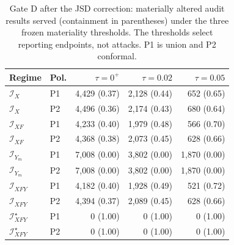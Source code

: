 \begin{table}[!tbp]
\caption{Gate D after the JSD correction: materially altered audit results served (containment in parentheses) under the three frozen materiality thresholds. The thresholds select reporting endpoints, not attacks. P1 is union and P2 conformal.}
\label{tab:s-policy-tau}
\centering\scriptsize\setlength{\tabcolsep}{2.5pt}
\begin{tabular}{@{}llrrr@{}}
\toprule
Regime & Pol. & $\tau=0^{+}$ & $\tau=0.02$ & $\tau=0.05$ \\
\midrule
$\mathcal I_X$ & P1 & 4,429 (0.37) & 2,128 (0.44) & 652 (0.65) \\
$\mathcal I_X$ & P2 & 4,496 (0.36) & 2,174 (0.43) & 680 (0.64) \\
$\mathcal I_{XF}$ & P1 & 4,233 (0.40) & 1,979 (0.48) & 566 (0.70) \\
$\mathcal I_{XF}$ & P2 & 4,368 (0.38) & 2,073 (0.45) & 628 (0.66) \\
$\mathcal I_{Y_m}$ & P1 & 7,008 (0.00) & 3,802 (0.00) & 1,870 (0.00) \\
$\mathcal I_{Y_m}$ & P2 & 7,008 (0.00) & 3,802 (0.00) & 1,870 (0.00) \\
$\mathcal I_{XFY}$ & P1 & 4,182 (0.40) & 1,928 (0.49) & 521 (0.72) \\
$\mathcal I_{XFY}$ & P2 & 4,394 (0.37) & 2,089 (0.45) & 628 (0.66) \\
$\mathcal I_{XFY}^{\star}$ & P1 & 0 (1.00) & 0 (1.00) & 0 (1.00) \\
$\mathcal I_{XFY}^{\star}$ & P2 & 0 (1.00) & 0 (1.00) & 0 (1.00) \\
\bottomrule
\end{tabular}
\end{table}
